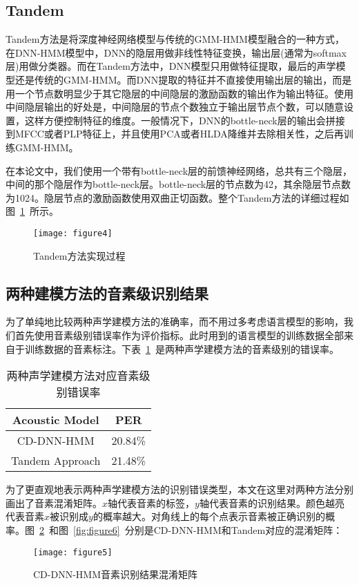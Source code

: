 \subsection{Tandem}
Tandem方法是将深度神经网络模型与传统的GMM-HMM模型融合的一种方式，在DNN-HMM模型中，DNN的隐层用做非线性特征变换，输出层(通常为softmax层)用做分类器。而在Tandem方法中，DNN模型只用做特征提取，最后的声学模型还是传统的GMM-HMM。而DNN提取的特征并不直接使用输出层的输出，而是用一个节点数明显少于其它隐层的中间隐层的激励函数的输出作为输出特征。使用中间隐层输出的好处是，中间隐层的节点个数独立于输出层节点个数，可以随意设置，这样方便控制特征的维度。一般情况下，DNN的bottle-neck层的输出会拼接到MFCC或者PLP特征上，并且使用PCA或者HLDA降维并去除相关性，之后再训练GMM-HMM。

在本论文中，我们使用一个带有bottle-neck层的前馈神经网络，总共有三个隐层，中间的那个隐层作为bottle-neck层。bottle-neck层的节点数为42，其余隐层节点数为1024。隐层节点的激励函数使用双曲正切函数。整个Tandem方法的详细过程如图~\ref{fig:figure4}~所示。
\begin{figure}[htbp]
\centering
\texttt{[image: figure4]}
\caption{Tandem方法实现过程}\label{fig:figure4}
\vspace{\baselineskip}
\end{figure}

\subsection{两种建模方法的音素级识别结果}
为了单纯地比较两种声学建模方法的准确率，而不用过多考虑语言模型的影响，我们首先使用音素级别错误率作为评价指标。此时用到的语言模型的训练数据全部来自于训练数据的音素标注。下表~\ref{tab:table1}~是两种声学建模方法的音素级别的错误率。
\begin{table}[htbp]
\caption{两种声学建模方法对应音素级别错误率}\label{tab:table1}
\vspace{0.5em}\centering\wuhao
\begin{tabular}{cc}
\toprule[1.5pt]
Acoustic Model & PER \\
\midrule[1pt]
 CD-DNN-HMM & 20.84\% \\
Tandem Approach & 21.48\% \\
\bottomrule[1.5pt]
\end{tabular}
\vspace{\baselineskip}
\end{table}

为了更直观地表示两种声学建模方法的识别错误类型，本文在这里对两种方法分别画出了音素混淆矩阵。$x$轴代表音素的标签，$y$轴代表音素的识别结果。颜色越亮代表音素$x$被识别成$y$的概率越大。对角线上的每个点表示音素被正确识别的概率。图~\ref{fig:figure5}~和图~\ref{fig:figure6}~分别是CD-DNN-HMM和Tandem对应的混淆矩阵：
\begin{figure}[htbp]
\centering
\texttt{[image: figure5]}
\caption{CD-DNN-HMM音素识别结果混淆矩阵}\label{fig:figure5}
\vspace{\baselineskip}
\end{figure}

